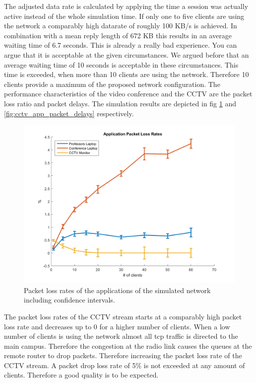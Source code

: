 \documentclass[
10pt, %
a4paper, %
oneside, %
headinclude,footinclude, %
BCOR5mm, %
]{scrartcl}
\begin{document}
The adjusted data rate is calculated by applying the time a session was actually active instead of the whole simulation time. If only one to five clients are using the network a comparably high datarate of roughly 100 KB/s is achieved. In combination with a mean reply length of 672 KB this results in an average waiting time of 6.7 seconds. This is already a really bad experience. You can argue that it is acceptable at the given circumstances. We argued before that an average waiting time of 10 seconds is acceptable in these circumstances. This time is exceeded, when more than 10 clients are using the network. Therefore 10 clients provide a maximum of the proposed network configuration.
The performance characteristics of the video conference and the CCTV are the packet loss ratio and packet delays. The simulation results are depicted in fig \ref{fig:cctv_app_packet_loss_rates} and \ref{fig:cctv_app_packet_delays} respectively.
\begin{figure}[!ht]
  \centering
  \includegraphics[width=\textwidth]{Figures/cctv_application_packet_loss_rates.png}
  \caption{Packet loss rates of the applications of the simulated network including confidence intervals.} \label{fig:cctv_app_packet_loss_rates}
\end{figure}
The packet loss rates of the CCTV stream starts at a comparably high packet loss rate and decreases up to 0 for a higher number of clients. When a low number of clients is using the network almost all tcp traffic is directed to the main campus. Therefore the congestion at the radio link causes the queues at the remote router to drop packets. Therefore increasing the packet loss rate of the CCTV stream. A packet drop loss rate of 5\% is not exceeded at any amount of clients. Therefore a good quality is to be expected.
\end{document}
